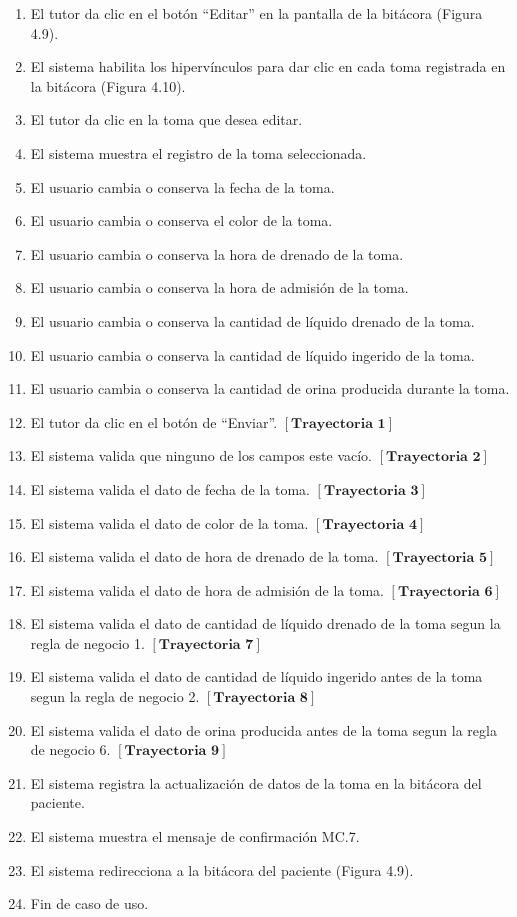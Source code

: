 \begin{enumerate}
\item El tutor da clic en el botón “Editar” en la pantalla de la bitácora (Figura 4.9).
\item El sistema habilita los hipervínculos para dar clic en cada toma registrada en la bitácora (Figura 4.10).
\item El tutor da clic en la toma que desea editar.
\item El sistema muestra el registro de la toma seleccionada.
\item El usuario cambia o conserva la fecha de la toma.
\item El usuario cambia o conserva el color de la toma.
\item El usuario cambia o conserva la hora de drenado de la toma.
\item El usuario cambia o conserva la hora de admisión de la toma.
\item El usuario cambia o conserva la cantidad de líquido drenado de la toma.
\item El usuario cambia o conserva la cantidad de líquido ingerido de la toma.
\item El usuario cambia o conserva la cantidad de orina producida durante la toma.
\item El tutor da clic en el botón de “Enviar”. $\left[\textbf{Trayectoria 1}\right]$
\item El sistema valida que ninguno de los campos este vacío. $\left[\textbf{Trayectoria 2}\right]$
\item El sistema valida el dato de fecha de la toma. $\left[\textbf{Trayectoria 3}\right]$
\item El sistema valida el dato de color de la toma. $\left[\textbf{Trayectoria 4}\right]$
\item El sistema valida el dato de hora de drenado de la toma. $\left[\textbf{Trayectoria 5}\right]$
\item El sistema valida el dato de hora de admisión de la toma. $\left[\textbf{Trayectoria 6}\right]$
\item El sistema valida el dato de cantidad de líquido drenado de la toma segun la regla de negocio 1. $\left[\textbf{Trayectoria 7}\right]$
\item El sistema valida el dato de cantidad de líquido ingerido antes de la toma segun la regla de negocio 2. $\left[\textbf{Trayectoria 8}\right]$
\item El sistema valida el dato de orina producida antes de la toma segun la regla de negocio 6. $\left[\textbf{Trayectoria 9}\right]$ 
\item El sistema registra la actualización de datos de la toma en la bitácora del paciente.
\item El sistema muestra el mensaje de confirmación MC.7.
\item El sistema redirecciona a la bitácora del paciente (Figura 4.9).
\item Fin de caso de uso.
\end{enumerate}
